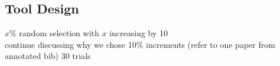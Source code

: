 \subsection{Tool Design}
$x\%$ random selection with $x$ increasing by 10 \\
continue discussing why we chose 10\% increments (refer to one paper from annotated bib)
30 trials

